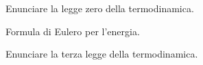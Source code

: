 \question  Enunciare la legge zero della termodinamica.


\question  Formula di Eulero per l'energia.

\question  Enunciare la terza legge della termodinamica.

